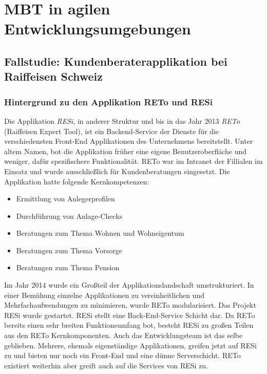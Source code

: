 \chapter{MBT in agilen Entwicklungsumgebungen}
\label{sec:problemdescription}


\section{Fallstudie: Kundenberaterapplikation bei Raiffeisen  Schweiz}

\label{sec:fallstudie}
\subsection{Hintergrund zu den Applikation RETo und RESi}
Die Applikation \textit{RESi}, in anderer Struktur und bis in das Jahr 2013 \textit{RETo} (Raiffeisen Expert Tool), ist ein Backend-Service der Dienste für die verschiedensten Front-End Applikationen des Unternehmens bereitstellt. Unter altem Namen, bot die Applikation früher eine eigene Benutzeroberfläche und weniger, dafür spezifischere Funktionalität. RETo war im Intranet der Fillialen im Einsatz und wurde ausschließlich für Kundenberatungen eingesetzt. Die Applikation hatte folgende Kernkompetenzen:

\begin{itemize}
\item Ermittlung von Anlegerprofilen
\item Durchführung von Anlage-Checks
\item Beratungen zum Thema Wohnen und Wohneigentum
\item Beratungen zum Thema Vorsorge
\item Beratungen zum Thema Pension
\end{itemize}

Im Jahr 2014 wurde ein Großteil der Applikationslandschaft umstrukturiert. In einer Bemühung einzelne Applikationen zu vereinheitlichen und Mehrfachaufwendungen zu minimieren, wurde RETo modularisiert. Das Projekt RESi wurde gestartet. RESi stellt eine Back-End-Service Schicht dar. Da RETo bereits einen sehr breiten Funktionsumfang bot, besteht RESi zu großen Teilen aus den RETo Kernkomponenten. Auch das Entwicklungsteam ist das selbe geblieben. Mehrere, ehemals eigenständige Applikationen, greifen jetzt auf RESi zu und bieten nur noch ein Front-End und eine dünne Serverschicht. RETo existiert weiterhin aber greift auch auf die Services von RESi zu.

